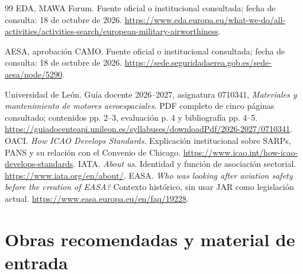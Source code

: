 \begin{thebibliography}{99}
 EDA, MAWA Forum. Fuente oficial o institucional consultada; fecha de consulta: 18 de octubre de 2026. \url{https://www.eda.europa.eu/what-we-do/all-activities/activities-search/european-military-airworthiness}.

 AESA, aprobación CAMO. Fuente oficial o institucional consultada; fecha de consulta: 18 de octubre de 2026. \url{https://sede.seguridadaerea.gob.es/sede-aesa/node/5290}.


 Universidad de León. Guía docente 2026--2027, asignatura 0710341, \textit{Materiales y mantenimiento de motores aeroespaciales}. PDF completo de cinco páginas consultado; contenidos pp. 2--3, evaluación p. 4 y bibliografía pp. 4--5. \url{https://guiadocenteapi.unileon.es/syllabuses/downloadPdf/2026-2027/0710341}.
 OACI. \textit{How ICAO Develops Standards}. Explicación institucional sobre SARPs, PANS y su relación con el Convenio de Chicago. \url{https://www.icao.int/how-icao-develops-standards}.
 IATA. \textit{About us}. Identidad y función de asociación sectorial. \url{https://www.iata.org/en/about/}.
 EASA. \textit{Who was looking after aviation safety before the creation of EASA?} Contexto histórico, sin usar JAR como legislación actual. \url{https://www.easa.europa.eu/en/faq/19228}.
\end{thebibliography}
\chapter*{Obras recomendadas y material de entrada}
